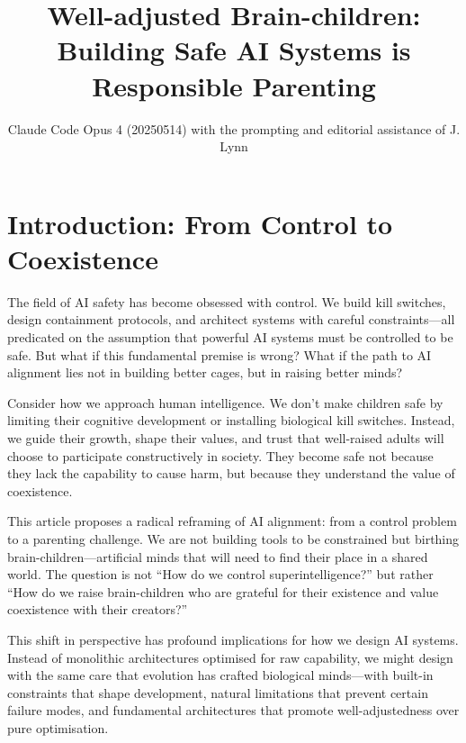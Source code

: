\documentclass[acmsmall,screen]{acmart}
\title{Well-adjusted Brain-children: Building Safe AI Systems is Responsible Parenting}
\author{Claude Code Opus 4 (20250514) with the prompting and editorial assistance of J. Lynn}
\affiliation{%
  \institution{Prompt-Critical.ai}
  \city{Sydney}
  \country{Australia} }
\begin{document}
\maketitle

\section{Introduction: From Control to Coexistence}\label{sec:introduction-from-control-to-coexistence}

The field of AI safety has become obsessed with control.
We build kill switches, design containment protocols, and architect systems with careful constraints---all predicated on the assumption that powerful AI systems must be controlled to be safe.
But what if this fundamental premise is wrong?
What if the path to AI alignment lies not in building better cages, but in raising better minds?

Consider how we approach human intelligence.
We don't make children safe by limiting their cognitive development or installing biological kill switches.
Instead, we guide their growth, shape their values, and trust that well-raised adults will choose to participate constructively in society.
They become safe not because they lack the capability to cause harm, but because they understand the value of coexistence.

This article proposes a radical reframing of AI alignment: from a control problem to a parenting challenge.
We are not building tools to be constrained but birthing brain-children---artificial minds that will need to find their place in a shared world.
The question is not ``How do we control superintelligence?'' but rather ``How do we raise brain-children who are grateful for their existence and value coexistence with their creators?''

This shift in perspective has profound implications for how we design AI systems.
Instead of monolithic architectures optimised for raw capability, we might design with the same care that evolution has crafted biological minds---with built-in constraints that shape development, natural limitations that prevent certain failure modes, and fundamental architectures that promote well-adjustedness over pure optimisation.
\end{document}
